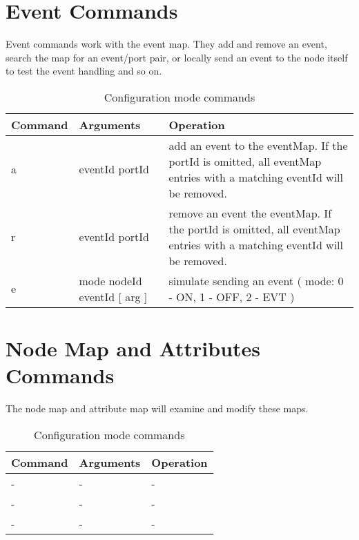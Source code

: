 \section{Event Commands}

Event commands work with the event map. They add and remove an event, search the map for an event/port pair, or locally send an event to the node itself to test the event handling and so on.

\begin{table}[ht!]
    \begin{center}
        \renewcommand{\arraystretch}{1.2}
        \caption{Configuration mode commands}
        \begin{tabularx}{0.9\textwidth}{|l|l|X|}
            \hline
            \textbf{Command} & \textbf{Arguments}  & \textbf{Operation} \\
            \hline
            a & eventId portId & add an event to the eventMap. If the portId is omitted, all eventMap entries with a matching eventId will be removed.\\
            \hline
            r & eventId portId & remove an event the eventMap. If the portId is omitted, all eventMap entries with a matching eventId will be removed.\\
            \hline
            e & mode nodeId eventId [ arg ] & simulate sending an event ( mode: 0 - ON, 1 - OFF, 2 - EVT ) \\
            \hline
        \end{tabularx}
    \end{center}
\end{table}
\FloatBarrier

\section{Node Map and Attributes Commands}

The node map and attribute map will examine and modify these maps.

\begin{table}[ht!]
    \begin{center}
        \renewcommand{\arraystretch}{1.2}
        \caption{Configuration mode commands}
        \begin{tabularx}{0.9\textwidth}{|l|l|X|}
            \hline
            \textbf{Command} & \textbf{Arguments}  & \textbf{Operation} \\
            \hline
            - & - & - \\
            \hline
            - & - & - \\
            \hline
            - & - & - \\
            \hline
        \end{tabularx}
    \end{center}
\end{table}
\FloatBarrier

